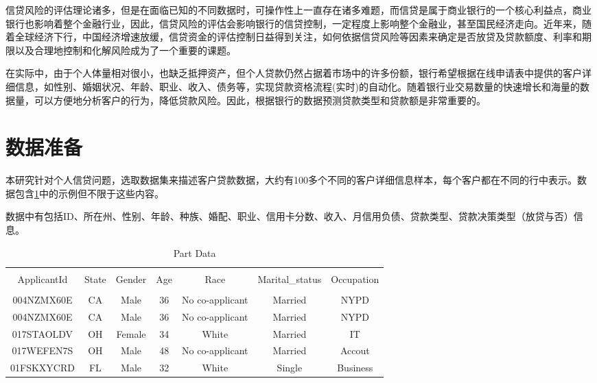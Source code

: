 \documentclass[UTF8]{ctexart}
\begin{document}
信贷风险的评估理论诸多，但是在面临已知的不同数据时，可操作性上一直存在诸多难题，而信贷是属于商业银行的一个核心利益点，商业银行也影响着整个金融行业，因此，信贷风险的评估会影响银行的信贷控制，一定程度上影响整个金融业，甚至国民经济走向。近年来，随着全球经济下行，中国经济增速放缓，信贷资金的评估控制日益得到关注，如何依据信贷风险等因素来确定是否放贷及贷款额度、利率和期限以及合理地控制和化解风险成为了一个重要的课题。

在实际中，由于个人体量相对很小，也缺乏抵押资产，但个人贷款仍然占据着市场中的许多份额，银行希望根据在线申请表中提供的客户详细信息，如性别、婚姻状况、年龄、职业、收入、债务等，实现贷款资格流程(实时)的自动化。随着银行业交易数量的快速增长和海量的数据量，可以方便地分析客户的行为，降低贷款风险。因此，根据银行的数据预测贷款类型和贷款额是非常重要的。



\section{数据准备}

本研究针对个人信贷问题，选取数据集来描述客户贷款数据，大约有100多个不同的客户详细信息样本，每个客户都在不同的行中表示。数据包含\ref{tab:addlabel}中的示例但不限于这些内容。

数据中有包括ID、所在州、性别、年龄、种族、婚配、职业、信用卡分数、收入、月信用负债、贷款类型、贷款决策类型（放贷与否）信息。


\begin{table}[htbp]
	\centering
	\caption{Part Data }
	\begin{tabular}{ccccccc}
		\toprule[1.5pt]\\
		ApplicantId & State & Gender & Age & Race  & Marital\_status & Occupation \\
		\midrule[1.0pt]\\
		004NZMX60E & CA    & Male  & 36    & No co-applicant & Married & NYPD \\
		004NZMX60E & CA    & Male  & 36    & No co-applicant & Married & NYPD \\
		017STAOLDV & OH    & Female & 34    & White & Married & IT \\
		017WEFEN7S & OH    & Male  & 48    & No co-applicant & Married & Accout \\
		01FSKXYCRD & FL    & Male  & 32    & White & Single & Business \\
		\bottomrule[1.5pt]
	\end{tabular}%
	\label{tab:addlabel}%
\end{table}%
\end{document}

